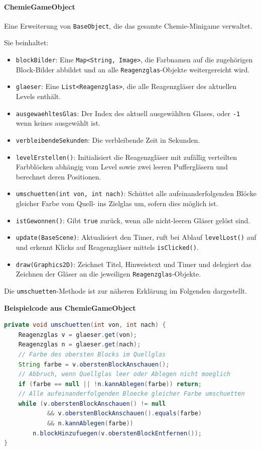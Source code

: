 \paragraph{ChemieGameObject}
Eine Erweiterung von \texttt{BaseObject}, die das gesamte Chemie-Minigame verwaltet.

Sie beinhaltet:
\begin{sloppypar}
    \begin{itemize}
        \item \texttt{blockBilder}: Eine \texttt{Map<String, Image>}, die Farbnamen auf die zugehörigen Block-Bilder abbildet und an alle \texttt{Reagenzglas}-Objekte weitergereicht wird.
        \item \texttt{glaeser}: Eine \texttt{List<Reagenzglas>}, die alle Reagenzgläser des aktuellen Levels enthält.
        \item \texttt{ausgewaehltesGlas}: Der Index des aktuell ausgewählten Glases, oder \texttt{-1} wenn keines ausgewählt ist.
        \item \texttt{verbleibendeSekunden}: Die verbleibende Zeit in Sekunden.
        \item \texttt{levelErstellen()}: Initialisiert die Reagenzgläser mit zufällig verteilten Farbblöcken abhängig vom Level sowie zwei leeren Puffergläsern und berechnet deren Positionen.
        \item \texttt{umschuetten(int von, int nach)}: Schüttet alle aufeinanderfolgenden Blöcke gleicher Farbe vom Quell- ins Zielglas um, sofern dies möglich ist.
        \item \texttt{istGewonnen()}: Gibt \texttt{true} zurück, wenn alle nicht-leeren Gläser gelöst sind.
        \item \texttt{update(BaseScene)}: Aktualisiert den Timer, ruft bei Ablauf \texttt{levelLost()} auf und erkennt Klicks auf Reagenzgläser mittels \texttt{isClicked()}.
        \item \texttt{draw(Graphics2D)}: Zeichnet Titel, Hinweistext und Timer und delegiert das Zeichnen der Gläser an die jeweiligen \texttt{Reagenzglas}-Objekte.
    \end{itemize}
\end{sloppypar}

Die \texttt{umschuetten}-Methode ist zur näheren Erklärung im Folgenden dargestellt.

\textbf{Beispielcode aus ChemieGameObject}
\begin{lstlisting}[caption=umschuetten-Methode, label=lst:mgumschuetten, captionpos=t, language=Java]
private void umschuetten(int von, int nach) {
    Reagenzglas v = glaeser.get(von);
    Reagenzglas n = glaeser.get(nach);
    // Farbe des obersten Blocks im Quellglas
    String farbe = v.oberstenBlockAnschauen();
    // Abbruch, wenn Quellglas leer oder Ablegen nicht moeglich
    if (farbe == null || !n.kannAblegen(farbe)) return;
    // Alle aufeinanderfolgenden Bloecke gleicher Farbe umschuetten
    while (v.oberstenBlockAnschauen() != null
            && v.oberstenBlockAnschauen().equals(farbe)
            && n.kannAblegen(farbe))
        n.blockHinzufuegen(v.oberstenBlockEntfernen());
}
\end{lstlisting}

